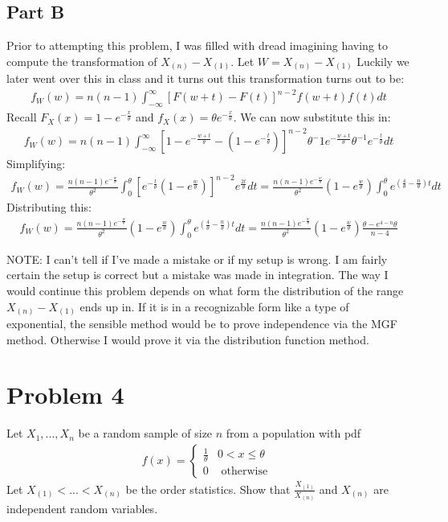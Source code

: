 \documentclass{article}
\begin{document}
\subsection*{Part B}
Prior to attempting this problem, I was filled with dread imagining having to compute the transformation of $X_{(n)}-X_{(1)}$. Let $W=X_{(n)}-X_{(1)}$ Luckily we later went over this in class and it turns out this transformation turns out to be:
\begin{align*}
f_{W}(w) = n(n-1) \int_{-\infty}^{\infty} [F(w+t)-F(t)]^{n-2} f(w+t)f(t) dt
\end{align*}
Recall $F_X(x)=1-e^{-\frac{x}{\theta}}$ and $f_X(x)=\theta e^{-\frac{x}{\theta}}$. We can now substitute this in:
\begin{align*}
f_{W}(w) = n(n-1) \int_{-\infty}^{\infty} [1-e^{-\frac{w+t}{\theta}}-(1-e^{-\frac{t}{\theta}})]^{n-2} \theta^-1 e^{-\frac{w+t}{\theta}}\theta^{-1} e^{-\frac{t}{\theta}} dt
\end{align*}
Simplifying:
\begin{align*}
f_{W}(w) = \frac{n(n-1) e^{-\frac{w}{\theta}}}{\theta^2} \int_{0}^{\theta} [e^{-\tfrac{t}{\theta}}(1-e^{\tfrac{w}{\theta}})]^{n-2} e^{\tfrac{2t}{\theta}} dt = \frac{n(n-1) e^{-\frac{w}{\theta}}}{\theta^2} (1-e^{\tfrac{w}{\theta}}) \int_{0}^{\theta} e^{(\tfrac{4}{\theta}-\tfrac{n}{\theta})t} dt
\end{align*}
Distributing this:
\begin{align*}
f_{W}(w) = \frac{n(n-1) e^{-\frac{w}{\theta}}}{\theta^2} (1-e^{\tfrac{w}{\theta}}) \int_{0}^{\theta}e^{(\tfrac{4}{\theta}-\tfrac{n}{\theta})t} dt = \frac{n(n-1) e^{-\frac{w}{\theta}}}{\theta^2} (1-e^{\tfrac{w}{\theta}}) \frac{\theta - e^{4-n}\theta}{n-4}
\end{align*}

NOTE: I can't tell if I've made a mistake or if my setup is wrong. I am fairly certain the setup is correct but a mistake was made in integration. The way I would continue this problem depends on what form the distribution of the range $X_{(n)}-X_{(1)}$ ends up in. If it is in a recognizable form like a type of exponential, the sensible method would be to prove independence via the MGF method. Otherwise I would prove it via the distribution function method.

\clearpage

\section*{Problem 4}
 Let $X_1,...,X_n$ be a random sample of size $n$ from a population with pdf
 \begin{align*}
 f(x) = \begin{cases} 
      \frac{1}{\theta} & 0<x\leq \theta \\
       0 & \text{ otherwise } 
   \end{cases}
\end{align*}
Let $X_{(1)}<...< X_{(n)}$ be the order statistics. Show that $\frac{X_{(1)}}{X_{(n)}}$ and $X_{(n)}$ are independent
random variables.
\end{document}
